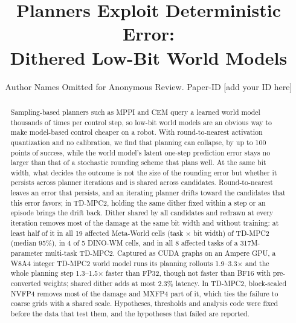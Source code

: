 \documentclass[conference]{IEEEtran}
\begin{document}
\title{Planners Exploit Deterministic Error:\\Dithered Low-Bit World Models}

\ifdefined\arxivversion
\author{
\and
{}
}
\else
\author{Author Names Omitted for Anonymous Review. Paper-ID [add your ID here]}
\fi

\maketitle

\begin{abstract}
Sampling-based planners such as MPPI and CEM query a learned world model thousands of times per control step, so low-bit world models are an obvious way to make model-based control cheaper on a robot. With round-to-nearest activation quantization and no calibration, we find that planning can collapse, by up to 100 points of success, while the world model's latent one-step prediction error stays no larger than that of a stochastic rounding scheme that plans well. At the same bit width, what decides the outcome is not the size of the rounding error but whether it persists across planner iterations and is shared across candidates. Round-to-nearest leaves an error that persists, and an iterating planner drifts toward the candidates that this error favors; in TD-MPC2, holding the same dither fixed within a step or an episode brings the drift back. Dither shared by all candidates and redrawn at every iteration removes most of the damage at the same bit width and without training: at least half of it in all 19 affected Meta-World cells (task $\times$ bit width) of TD-MPC2 (median 95\%), in 4 of 5 DINO-WM cells, and in all 8 affected tasks of a 317M-parameter multi-task TD-MPC2. Captured as CUDA graphs on an Ampere GPU, a W8A4 integer TD-MPC2 world model runs its planning rollouts 1.9--3.3$\times$ and the whole planning step 1.3--1.5$\times$ faster than FP32, though not faster than BF16 with pre-converted weights; shared dither adds at most 2.3\% latency. In TD-MPC2, block-scaled NVFP4 removes most of the damage and MXFP4 part of it, which ties the failure to coarse grids with a shared scale. Hypotheses, thresholds and analysis code were fixed before the data that test them, and the hypotheses that failed are reported.
\end{abstract}
\end{document}

